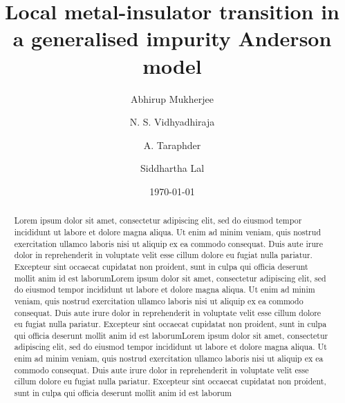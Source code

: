 \documentclass[reprint,superscriptaddress,floatfix]{revtex4-2}
\begin{document}
\title{Local metal-insulator transition in a generalised impurity Anderson model}
\author{Abhirup Mukherjee}
\author{N. S. Vidhyadhiraja}
\author{A. Taraphder}
\author{Siddhartha Lal}

\date{\today}

\begin{abstract}
Lorem ipsum dolor sit amet, consectetur adipiscing elit, sed do eiusmod tempor incididunt ut labore et dolore magna aliqua. Ut enim ad minim veniam, quis nostrud exercitation ullamco laboris nisi ut aliquip ex ea commodo consequat. Duis aute irure dolor in reprehenderit in voluptate velit esse cillum dolore eu fugiat nulla pariatur. Excepteur sint occaecat cupidatat non proident, sunt in culpa qui officia deserunt mollit anim id est laborumLorem ipsum dolor sit amet, consectetur adipiscing elit, sed do eiusmod tempor incididunt ut labore et dolore magna aliqua. Ut enim ad minim veniam, quis nostrud exercitation ullamco laboris nisi ut aliquip ex ea commodo consequat. Duis aute irure dolor in reprehenderit in voluptate velit esse cillum dolore eu fugiat nulla pariatur. Excepteur sint occaecat cupidatat non proident, sunt in culpa qui officia deserunt mollit anim id est laborumLorem ipsum dolor sit amet, consectetur adipiscing elit, sed do eiusmod tempor incididunt ut labore et dolore magna aliqua. Ut enim ad minim veniam, quis nostrud exercitation ullamco laboris nisi ut aliquip ex ea commodo consequat. Duis aute irure dolor in reprehenderit in voluptate velit esse cillum dolore eu fugiat nulla pariatur. Excepteur sint occaecat cupidatat non proident, sunt in culpa qui officia deserunt mollit anim id est laborum
\end{abstract}

\maketitle

\end{document}
